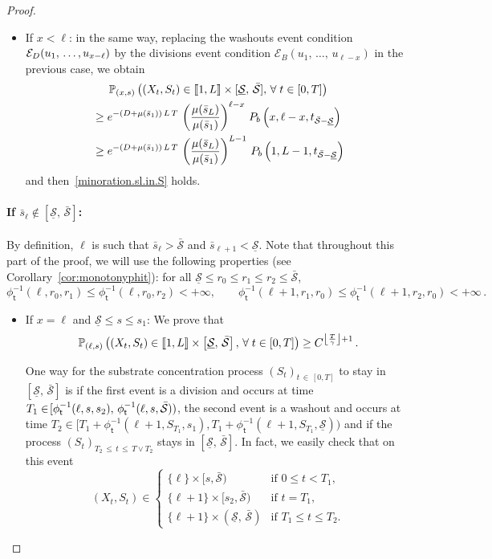 \documentclass[AHL,Unicode,longabstracts,published]{cedram}
\newcommand{\llbracket}{\mathopen{[\mkern -2.7mu[}}
\newcommand{\rrbracket}{\mathclose{]\mkern -2.7mu]}}
\newcommand{\PP}{\mathbb{P}}
\newcommand{\clE}{\mathcal{E}}
\newcommand{\Smin}{\underline{\mathcal{S}}}
\newcommand{\Smax}{\bar{\mathcal{S}}}
\newcommand{\barmu}{\mu(\bar s_1)}
\newcommand{\phit}{\phi_\textsf{t}^{-1}}
\newcommand{\setunL}{\llbracket 1, L\rrbracket}
\newcommand{\1}{\mathbf{1}}
\let\oldforall\forall
\renewcommand*{\forall}{\mathrel{\oldforall}}
\begin{document}
\begin{proof}
\begin{itemize}
\item If $x < \ell$: in the same way, replacing the washouts event condition $\clE_D(u_1,\,\dots,\linebreak u_{x-\ell})$ by the divisions event condition $\clE_B(u_1,\,\dots,\,u_{\ell-x})$ in the previous case, we obtain
\begin{multline*}
 \PP_{(x,s)}
\left((X_t,S_t) \in \setunL \times [\Smin, \, \Smax], \,
\forall t\in[0,T]\right)
\\
\begin{aligned}
&\geq e^{-(D+\barmu)\,L\,T}\, \left(\frac{\mu(\bar s_L)}{\barmu}\right)^{\ell-x}
\,P_b\left(x,\ell-x, t_{\Smax-\Smin}\right)
\\
&
\geq e^{-(D+\barmu)\,L\,T}\, \left(\frac{\mu(\bar s_L)}{\barmu}\right)^{L-1}\, P_b\left(1,L-1, t_{\Smax-\Smin}\right)
\end{aligned}
\end{multline*}
and then~\eqref{minoration.sl.in.S} holds.
\end{itemize}



\paragraph{If $\bar s_\ell \notin [\Smin, \, \Smax]$:}
By definition, $\ell$ is such that $\bar s_\ell > \Smax$ and $\bar s_{\ell+1} < \Smin$. Note that throughout this part of the proof, we will use the following properties (see Corollary~\ref{cor:monotonyphit}): for all $\Smin \leq r_0 \leq r_1 \leq r_2 \leq \Smax$,
\[
\phit(\ell, r_0, r_1) \leq \phit(\ell, r_0, r_2)<+\infty, \qquad
\phit(\ell+1, r_1,r_0) \leq \phit(\ell+1,r_2,r_0)<+\infty\,.
\]
\begin{itemize}
\item If $x=\ell$ and $\Smin\leq s\leq s_1$: We prove that
\begin{align}\label{eq.p.fct.s1s2}
\PP_{(\ell,s)}
\left(\left(X_t,S_t\right) \in \setunL \times \left[\Smin, \, \Smax\right], \,
\forall t\in[0,T]\right) \geq C^{\left\lfloor\frac{T}{\gamma}\right\rfloor+1}\,.
\end{align}

One way for the substrate concentration process $(S_t)_{t\,\in\,[0,T]}$ to stay in $[\Smin, \, \Smax]$ is if the first event is a division and occurs at time $T_1 \in\! [\phit(\ell,s,s_2),\, \phit(\ell,s,\linebreak\Smax))$, the second event is a washout and occurs at time $T_2 \in [T_1+\phit(\ell+1,S_{T_1},s_1),T_1+\phit(\ell+1,S_{T_1},\Smin))$ and if the process $(S_t)_{T_2\,\leq\,t\,\leq\,T\vee T_2}$ stays in $[\Smin, \, \Smax]$. In fact, we easily check that on this event
\[
\left(X_t,S_t\right) \in
\begin{cases}
\{\ell\}\times[s,\Smax) & \text{if } 0 \leq t < T_1,\\
\{\ell+1\}\times[s_2,\Smax) & \text{if } t= T_1,\\
\{\ell+1\}\times(\Smin,\, \Smax) & \text{if } T_1 \leq t \leq T_2.
\end{cases}
\]


\end{itemize}
\end{proof}
\end{document}
